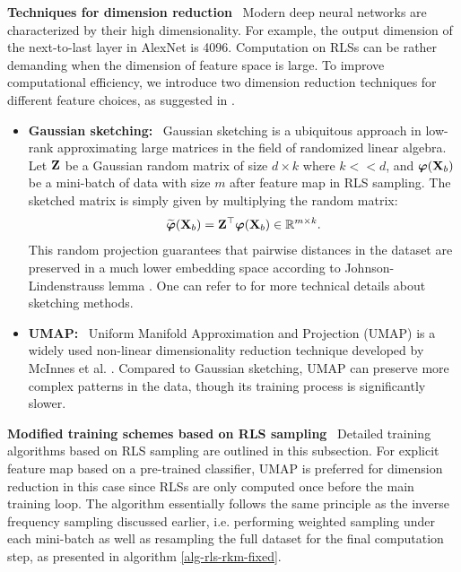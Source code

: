\noindent\textbf{Techniques for dimension reduction }\ Modern deep neural networks are characterized by their high dimensionality. For example, the output dimension of the next-to-last layer in AlexNet\cite{krizhevskyImageNetClassificationDeep2012} is 4096. Computation on RLSs can be rather demanding when the dimension of feature space is large. To improve computational efficiency, we introduce two dimension reduction techniques for different feature choices, as suggested in \cite{schreursLeverageScoreSampling2022}.
\begin{itemize}
    \item \textbf{Gaussian sketching: }\ Gaussian sketching is a ubiquitous approach in low-rank approximating large matrices in the field of randomized linear algebra. Let $\mathbf{Z}$ be a Gaussian random matrix of size $d\times k$ where $k << d$, and $\boldsymbol{\varphi}(\mathbf{X}_{b})$ be a mini-batch of data with size $m$ after feature map in RLS sampling. The sketched matrix is simply given by multiplying the random matrix: 
    \begin{equation}
        \widetilde{\boldsymbol{\varphi}}(\mathbf{X}_{b}) = \mathbf{Z}^{\top}\boldsymbol{\varphi}(\mathbf{X}_{b})\in \mathbb{R}^{m\times k}.
    \end{equation}
    This random projection guarantees that pairwise distances in the dataset are preserved in a much lower embedding space according to Johnson-Lindenstrauss lemma \cite{schreursLeverageScoreSampling2022}. One can refer to \cite{woodruffSketchingToolNumerical2014} for more technical details about sketching methods.
    \item \textbf{UMAP: }\ Uniform Manifold Approximation and Projection (UMAP) is a widely used non-linear dimensionality reduction technique developed by McInnes et al. \cite{mcinnesUMAPUniformManifold2020}. Compared to Gaussian sketching, UMAP can preserve more complex patterns in the data, though its training process is significantly slower.
\end{itemize}

\noindent\textbf{Modified training schemes based on RLS sampling }\ Detailed training algorithms based on RLS sampling are outlined in this subsection. For explicit feature map based on a pre-trained classifier, UMAP is preferred for dimension reduction in this case since RLSs are only computed once before the main training loop. The algorithm essentially follows the same principle as the inverse frequency sampling discussed earlier, i.e. performing weighted sampling under each mini-batch as well as resampling the full dataset for the final computation step, as presented in algorithm \ref{alg-rls-rkm-fixed}. 



